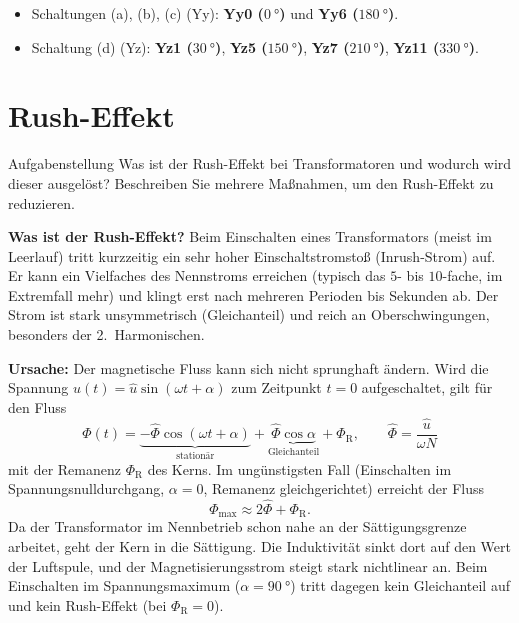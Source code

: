 \begin{ergebnis}
\begin{itemize}[nosep]
  \item Schaltungen (a), (b), (c) (Yy): \textbf{Yy0 ($\SI{0}{\degree}$)} und \textbf{Yy6 ($\SI{180}{\degree}$)}.
  \item Schaltung (d) (Yz): \textbf{Yz1 ($\SI{30}{\degree}$)}, \textbf{Yz5 ($\SI{150}{\degree}$)}, \textbf{Yz7 ($\SI{210}{\degree}$)}, \textbf{Yz11 ($\SI{330}{\degree}$)}.
\end{itemize}
\end{ergebnis}

\section{Rush-Effekt}\label{sec:a4}

\begin{aufgabe}{Aufgabenstellung}
Was ist der Rush-Effekt bei Transformatoren und wodurch wird dieser ausgelöst? Beschreiben Sie mehrere Maßnahmen, um den Rush-Effekt zu reduzieren.
\end{aufgabe}

\textbf{Was ist der Rush-Effekt?} Beim Einschalten eines Transformators (meist im Leerlauf) tritt kurzzeitig ein sehr hoher Einschaltstromstoß (Inrush-Strom) auf. Er kann ein Vielfaches des Nennstroms erreichen (typisch das $5$- bis $10$-fache, im Extremfall mehr) und klingt erst nach mehreren Perioden bis Sekunden ab. Der Strom ist stark unsymmetrisch (Gleichanteil) und reich an Oberschwingungen, besonders der 2.~Harmonischen.

\textbf{Ursache:} Der magnetische Fluss kann sich nicht sprunghaft ändern. Wird die Spannung $u(t)=\hat{u}\sin(\omega t+\alpha)$ zum Zeitpunkt $t=0$ aufgeschaltet, gilt für den Fluss
\begin{equation*}
  \Phi(t) = \underbrace{-\hat{\Phi}\cos(\omega t+\alpha)}_{\text{stationär}}
            + \underbrace{\hat{\Phi}\cos\alpha}_{\text{Gleichanteil}}
            + \Phi_\mathrm{R},
  \qquad \hat{\Phi}=\frac{\hat{u}}{\omega N}
\end{equation*}
mit der Remanenz $\Phi_\mathrm{R}$ des Kerns. Im ungünstigsten Fall (Einschalten im Spannungsnulldurchgang, $\alpha=0$, Remanenz gleichgerichtet) erreicht der Fluss
\begin{equation*}
  \Phi_{\max} \approx 2\hat{\Phi} + \Phi_\mathrm{R}.
\end{equation*}
Da der Transformator im Nennbetrieb schon nahe an der Sättigungsgrenze arbeitet, geht der Kern in die Sättigung. Die Induktivität sinkt dort auf den Wert der Luftspule, und der Magnetisierungsstrom steigt stark nichtlinear an. Beim Einschalten im Spannungsmaximum ($\alpha=\SI{90}{\degree}$) tritt dagegen kein Gleichanteil auf und kein Rush-Effekt (bei $\Phi_\mathrm{R}=0$).

